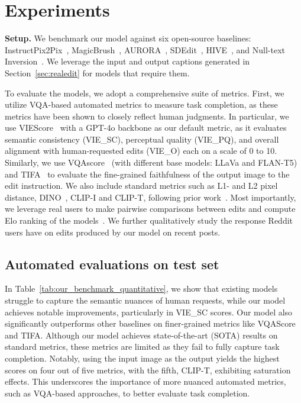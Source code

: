 \section{Experiments} \label{sec:results}
\noindent\textbf{Setup.} We benchmark our model against six open-source baselines: InstructPix2Pix~\cite{brooks2023instructpix2pix}, MagicBrush~\cite{zhang2024magicbrush}, AURORA~\cite{krojer2024learning}, SDEdit~\cite{meng2021sdedit}, HIVE~\cite{zhang2024hive}, and Null-text Inversion~\cite{mokady2023null}.
We leverage the input and output captions generated in Section~\ref{sec:realedit} for models that require them.


To evaluate the models, we adopt a comprehensive suite of metrics.
First, we utilize VQA-based automated metrics to measure task completion, as these metrics have been shown to closely reflect human judgments. In particular, we use VIEScore~\cite{ku2023viescore} with a GPT-4o backbone as our default metric, as it evaluates semantic consistency (VIE\_SC), perceptual quality (VIE\_PQ), and overall alignment with human-requested edits (VIE\_O) each on a scale of 0 to 10. 
Similarly, we use VQAscore~\cite{lin2024evaluating} (with different base models: 
 LLaVa and FLAN-T5) and TIFA~\cite{hu2023tifa} to evaluate the fine-grained faithfulness of the output image to the edit instruction.
We also include standard metrics such as L1- and L2 pixel distance, DINO~\cite{zhang2022dino}, CLIP-I and CLIP-T, following prior work~\cite{zhang2024magicbrush, sheynin2024emu}.
Most importantly, we leverage real users to make pairwise comparisons between edits and compute Elo ranking of the models~\cite{jiang2024genai}. We further qualitatively study the response Reddit users have on edits produced by our model on recent posts.



\subsection{Automated evaluations on \ours test set}
In Table~\ref{tab:our_benchmark_quantitative}, we show that existing models struggle to capture the semantic nuances of human requests, while our model achieves notable improvements, particularly in VIE\_SC scores. Our model also significantly outperforms other baselines on finer-grained metrics like VQAScore and TIFA. Although our model achieves state-of-the-art (SOTA) results on standard metrics, these metrics are limited as they fail to fully capture task completion. Notably, using the input image as the output yields the highest scores on four out of five metrics, with the fifth, CLIP-T, exhibiting saturation effects. This underscores the importance of more nuanced automated metrics, such as VQA-based approaches, to better evaluate task completion.

